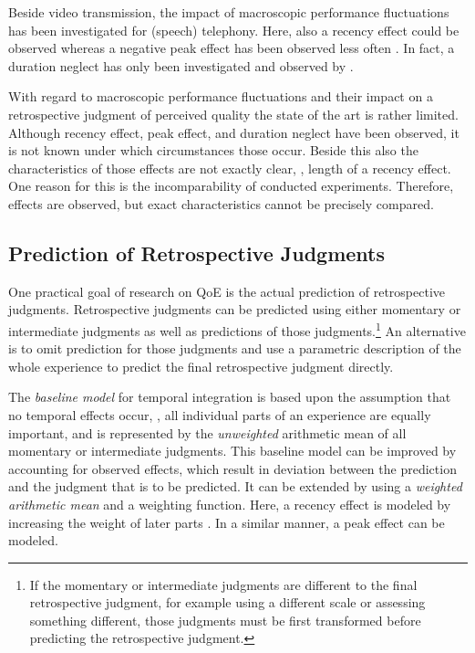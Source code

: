 Beside video transmission, the impact of macroscopic performance fluctuations has been investigated for (speech) telephony. %
Here, also a recency effect could be observed \citep[\eg,][]{rosenbluth_testing_1998, hamberg_time-varying_1999, gros_instantaneous_2001, gros_effects_2004, belmudez_audiovisual_2015, weiss_modeling_2009, lewcio_management_2014} whereas a negative peak effect has been observed less often \citep[\eg,][]{weiss_modeling_2009, belmudez_audiovisual_2015, lewcio_management_2014}.
In fact, a duration neglect has only been investigated and observed by \citet{rosenbluth_testing_1998}.

With regard to macroscopic performance fluctuations and their impact on a retrospective judgment of perceived quality the state of the art is rather limited.
Although recency effect, peak effect, and duration neglect have been observed, it is not known under which circumstances those occur.
Beside this also the characteristics of those effects are not exactly clear, \ie, length of a recency effect.
One reason for this is the incomparability of conducted experiments.
Therefore, effects are observed, but exact characteristics cannot be precisely compared.

\subsection{Prediction of Retrospective Judgments}
One practical goal of research on \ac{QoE} is the actual prediction of retrospective judgments.
Retrospective judgments can be predicted using either momentary or intermediate judgments as well as predictions of those judgments.\footnote{If the momentary or intermediate judgments are different to the final retrospective judgment, for example using a different scale or assessing something different, those judgments must be first transformed before predicting the retrospective judgment.}
An alternative is to omit prediction for those judgments and use a parametric description of the whole experience to predict the final retrospective judgment directly.

The \emph{baseline model} for temporal integration is based upon the assumption that no temporal effects occur, \ie, all individual parts of an experience are equally important, and is represented by the \emph{unweighted} arithmetic mean of all momentary or intermediate judgments.
This baseline model can be improved by accounting for observed effects, which result in deviation between the prediction and the judgment that is to be predicted.
It can be extended by using a \emph{weighted arithmetic mean} and a weighting function.
Here, a recency effect is modeled by increasing the weight of later parts \citep[][]{rosenbluth_testing_1998, weiss_modeling_2009, hamberg_time-varying_1999}.
In a similar manner, a peak effect can be modeled.

